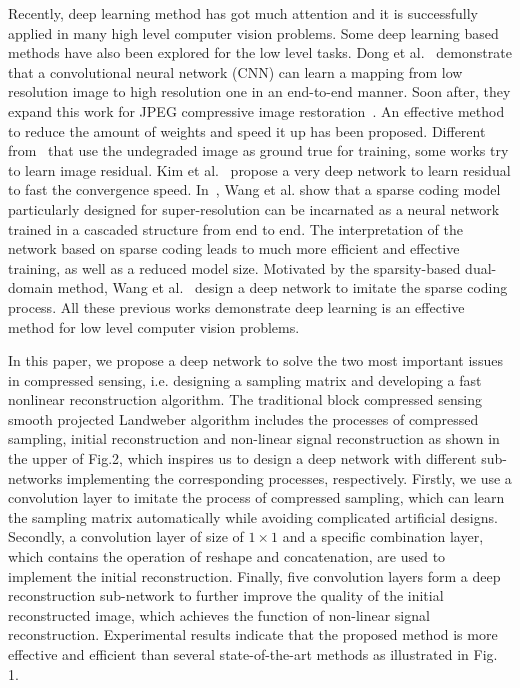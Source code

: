 \documentclass[5pt]{article}
\begin{document}
Recently, deep learning method has got much attention and it is successfully applied in many high level computer vision problems. Some deep learning based methods have also been explored for the low level tasks. Dong et al.~\cite{rf12} demonstrate that a convolutional neural network (CNN) can learn a mapping from low resolution image to high resolution one in an end-to-end manner. Soon after, they expand this work for JPEG compressive image restoration~\cite{rf13}. An effective method~\cite{rf14} to reduce the amount of weights and speed it up has been proposed. Different from~\cite{rf12,rf13,rf14} that use the undegraded image as ground true for training, some works try to learn image residual. Kim et al.~\cite{rf15} propose a very deep network to learn residual to fast the convergence speed. In~\cite{rf16}, Wang et al. show that a sparse coding model particularly designed for super-resolution can be incarnated as a neural network trained in a cascaded structure from end to end. The interpretation of the network based on sparse coding leads to much more efficient and effective training, as well as a reduced model size. Motivated by the sparsity-based dual-domain method, Wang et al.~\cite{rf17} design a deep network to imitate the sparse coding process. All these previous works demonstrate deep learning is an effective method for low level computer vision problems.

In this paper, we propose a deep network to solve the two most important issues in compressed sensing, i.e. designing a sampling matrix and developing a fast nonlinear reconstruction algorithm. The traditional block compressed sensing smooth projected Landweber algorithm includes the processes of compressed sampling, initial reconstruction and non-linear signal reconstruction as shown in the upper of Fig.2, which inspires us to design a deep network with different sub-networks implementing the corresponding processes, respectively. Firstly, we use a convolution layer to imitate the process of compressed sampling, which can learn the sampling matrix automatically while avoiding complicated artificial designs. Secondly, a convolution layer of size of $1 \times 1$ and a specific combination layer, which contains the operation of reshape and concatenation, are used to implement the initial reconstruction. Finally, five convolution layers form a deep reconstruction sub-network to further improve the quality of the initial reconstructed image, which achieves the function of non-linear signal reconstruction. Experimental results indicate that the proposed method is more effective and efficient than several state-of-the-art methods as illustrated in Fig. 1.
\end{document}
